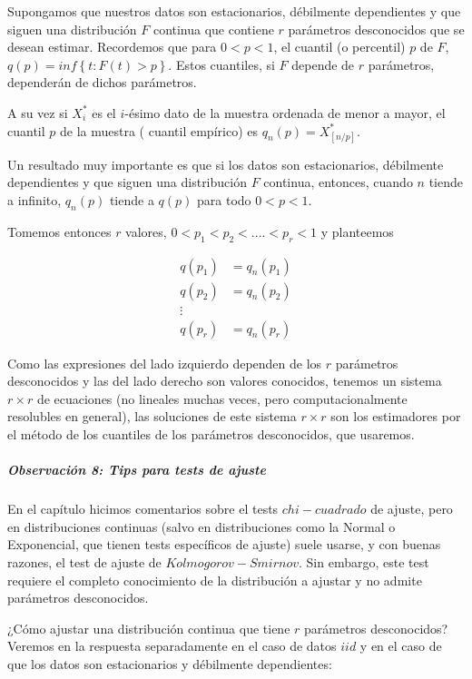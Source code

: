 \documentclass[
  12pt]{article}
\begin{document}
Supongamos que nuestros datos son estacionarios, débilmente dependientes
y que siguen una distribución \(F\) continua que contiene \(r\)
parámetros desconocidos que se desean estimar. Recordemos que para
\(0<p<1\), el cuantil (o percentil) \(p\) de \(F\),
\(q(p)= inf \left \{t:F(t)>p \right \}\). Estos cuantiles, si \(F\)
depende de \(r\) parámetros, dependerán de dichos parámetros.

A su vez si \(X_i^*\) es el \(i\)-ésimo dato de la muestra ordenada de
menor a mayor, el cuantil \(p\) de la muestra ( cuantil empírico) es
\(q_n(p)= X_{[n/p]}^*\).

Un resultado muy importante es que si los datos son estacionarios,
débilmente dependientes y que siguen una distribución \(F\) continua,
entonces, cuando \(n\) tiende a infinito, \(q_n(p)\) tiende a \(q(p)\)
para todo \(0<p<1\).

Tomemos entonces \(r\) valores, \(0<p_1<p_2<....<p_r<1\) y planteemos

\begin{align*}
q(p_1)&=q_n(p_1)\\
q(p_2)&=q_n(p_2)\\
\vdots \\
q(p_r)&=q_n(p_r)
\end{align*}

Como las expresiones del lado izquierdo dependen de los \(r\) parámetros
desconocidos y las del lado derecho son valores conocidos, tenemos un
sistema \(r\times r\) de ecuaciones (no lineales muchas veces, pero
computacionalmente resolubles en general), las soluciones de este
sistema \(r\times r\) son los estimadores por el método de los cuantiles
de los parámetros desconocidos, que usaremos.

\subparagraph{Observación 8: Tips para tests de
ajuste}\label{observaciuxf3n-8-tips-para-tests-de-ajuste}

En el capítulo hicimos comentarios sobre el tests \(chi- cuadrado\) de
ajuste, pero en distribuciones continuas (salvo en distribuciones como
la Normal o Exponencial, que tienen tests específicos de ajuste) suele
usarse, y con buenas razones, el test de ajuste de
\(Kolmogorov-Smirnov\). Sin embargo, este test requiere el completo
conocimiento de la distribución a ajustar y no admite parámetros
desconocidos.

¿Cómo ajustar una distribución continua que tiene \(r\) parámetros
desconocidos? Veremos en la respuesta separadamente en el caso de datos
\(iid\) y en el caso de que los datos son estacionarios y débilmente
dependientes:
\end{document}
